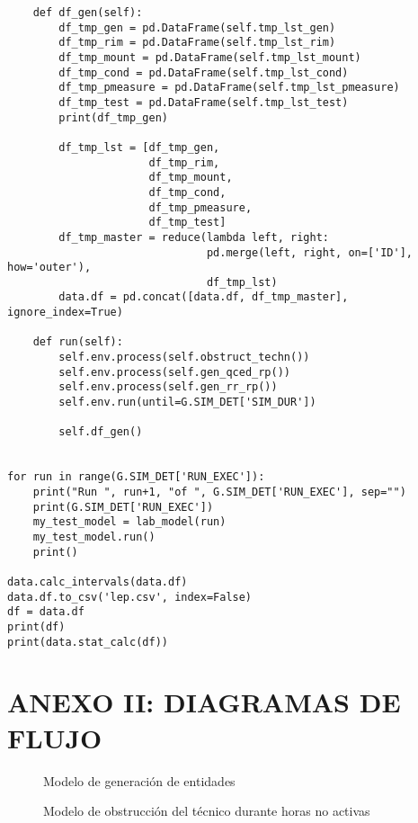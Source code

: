 \begin{verbatim}
    def df_gen(self):
        df_tmp_gen = pd.DataFrame(self.tmp_lst_gen)
        df_tmp_rim = pd.DataFrame(self.tmp_lst_rim)
        df_tmp_mount = pd.DataFrame(self.tmp_lst_mount)
        df_tmp_cond = pd.DataFrame(self.tmp_lst_cond)
        df_tmp_pmeasure = pd.DataFrame(self.tmp_lst_pmeasure)
        df_tmp_test = pd.DataFrame(self.tmp_lst_test)
        print(df_tmp_gen)

        df_tmp_lst = [df_tmp_gen,
                      df_tmp_rim,
                      df_tmp_mount,
                      df_tmp_cond,
                      df_tmp_pmeasure,
                      df_tmp_test]
        df_tmp_master = reduce(lambda left, right:
                               pd.merge(left, right, on=['ID'], how='outer'),
                               df_tmp_lst)
        data.df = pd.concat([data.df, df_tmp_master], ignore_index=True)

    def run(self):
        self.env.process(self.obstruct_techn())
        self.env.process(self.gen_qced_rp())
        self.env.process(self.gen_rr_rp())
        self.env.run(until=G.SIM_DET['SIM_DUR'])

        self.df_gen()


for run in range(G.SIM_DET['RUN_EXEC']):
    print("Run ", run+1, "of ", G.SIM_DET['RUN_EXEC'], sep="")
    print(G.SIM_DET['RUN_EXEC'])
    my_test_model = lab_model(run)
    my_test_model.run()
    print()

data.calc_intervals(data.df)
data.df.to_csv('lep.csv', index=False)
df = data.df
print(df)
print(data.stat_calc(df))

\end{verbatim}
\newpage

\section{ANEXO II: DIAGRAMAS DE FLUJO}\label{apnd3}

\begin{figure}[H]
	\begin{center}
		
	\end{center}
	\caption{Modelo de generación de entidades}
\end{figure}

\begin{figure}[H]
	\begin{center}
		
	\end{center}
	\caption{Modelo de obstrucción del técnico durante horas no activas}
\end{figure}

